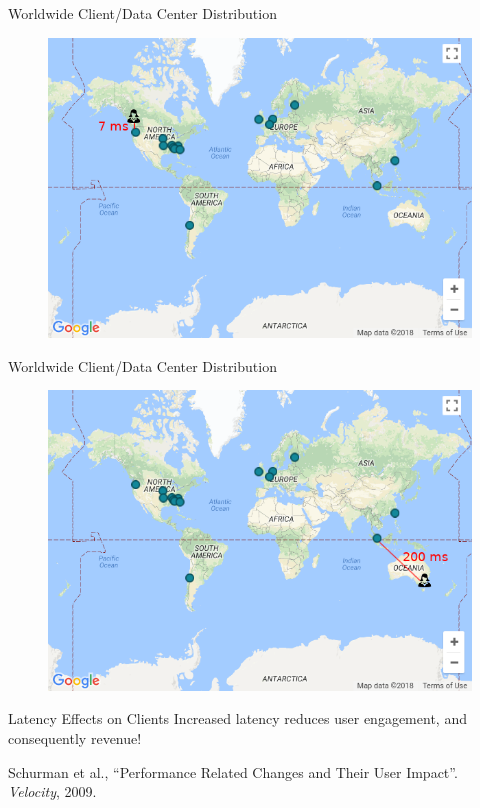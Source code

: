 \documentclass[10pt]{beamer}
\begin{document}
\begin{frame}{Worldwide Client/Data Center Distribution}
    \begin{figure}
        \center
        \includegraphics[scale=0.45]{apollo_google_vancouver}
    \end{figure}
\end{frame}

\begin{frame}{Worldwide Client/Data Center Distribution}
    \begin{figure}
        \center
        \includegraphics[scale=0.45]{apollo_google_oceania}
    \end{figure}
\end{frame}

\begin{frame}{Latency Effects on Clients}
    Increased latency reduces \alert{user engagement}, and consequently \alert{revenue}! \\
    \vspace{1cm}

    \small{Schurman et al., ``Performance Related Changes and Their User Impact''. \emph{Velocity}, 2009.}
\end{frame}
\end{document}
